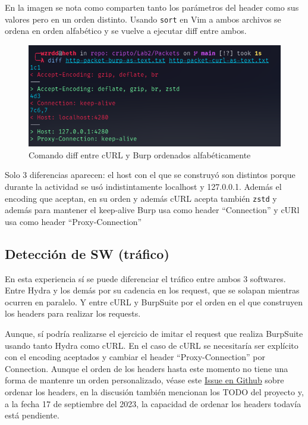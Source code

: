 \documentclass[letter,12pt]{article}
\newcommand{\code}[1]{\colorbox{lightgray!80}{\lstinline[breaklines=true]|#1|}}
\begin{document}
En la imagen se nota como comparten tanto los parámetros del header como sus
valores pero en un orden distinto. Usando \code{sort} en Vim a ambos archivos se
ordena en orden alfabético y se vuelve a ejecutar diff entre ambos.

\begin{figure}[H]
  \centering
  \includegraphics[width=16.5cm]{images/23-diff-burp-curl.png}
  \caption{Comando diff entre cURL y Burp ordenados alfabéticamente}
\end{figure}

Solo 3 diferencias aparecen: el host con el que se construyó son distintos
porque durante la actividad se usó indistintamente localhost y 127.0.0.1. Además
el encoding que aceptan, en su orden y además cURL acepta también \code{zstd} y
además para mantener el keep-alive Burp usa como header ``Connection'' y cURl
usa como header ``Proxy-Connection''

\subsection{Detección de SW (tráfico)}
En esta experiencia sí se puede diferenciar el tráfico entre ambos 3 softwares.
Entre Hydra y los demás por su cadencia en los request, que se solapan mientras
ocurren en paralelo. Y entre cURL y BurpSuite por el orden en el que construyen
los headers para realizar los requests.

Aunque, sí podría realizarse el ejercicio de imitar el request que realiza
BurpSuite usando tanto Hydra como cURL. En el caso de cURL se necesitaría ser
explícito con el encoding aceptados y cambiar el header ``Proxy-Connection'' por
Connection. Aunque el orden de los headers hasta este momento no tiene una forma
de mantenre un orden personalizado, véase
este \href{https://github.com/curl/curl/issues/3282}{Issue en Github} sobre
ordenar los headers, en la discusión también mencionan los TODO del proyecto y,
a la fecha 17 de septiembre del 2023, la capacidad de ordenar los headers
todavía está pendiente.
\end{document}

